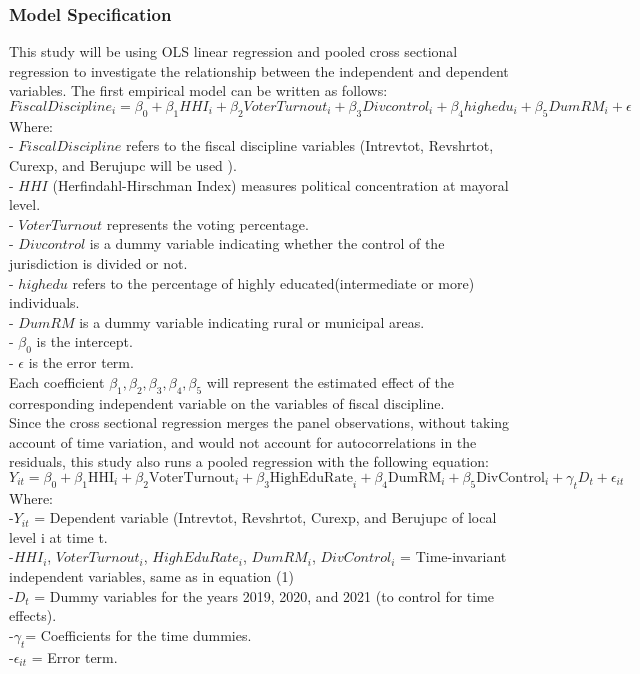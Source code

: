 \subsubsection{Model Specification}
This study will be using OLS linear regression and pooled cross sectional regression to investigate the relationship between the independent and dependent variables. The first empirical model can be written as follows:
\begin{equation}
FiscalDiscipline_i = \beta_0 + \beta_1 HHI_i + \beta_2 VoterTurnout_i + \beta_3 Divcontrol_i+  \beta_4 highedu _i+ \beta_5 DumRM_i + \epsilon
\end{equation}
Where:\\
- \(FiscalDiscipline\) refers to the fiscal discipline variables (Intrevtot, Revshrtot, Curexp, and Berujupc will be used ).\\
- \(HHI\) (Herfindahl-Hirschman Index) measures political concentration at mayoral level.\\
- \(VoterTurnout\) represents the voting percentage.\\
- \(Divcontrol\) is a dummy variable indicating whether the control of the jurisdiction is divided or not.\\
- \(highedu\) refers to the percentage of highly educated(intermediate or more) individuals.\\
- \(DumRM\) is a dummy variable indicating rural or municipal areas.\\
- \(\beta_0\) is the intercept.\\
- \(\epsilon\) is the error term.\\
Each coefficient \(\beta_1, \beta_2, \beta_3, \beta_4, \beta_5\) will represent the estimated effect of the corresponding independent variable on the variables of fiscal discipline.\\
Since the cross sectional regression merges the panel observations, without taking account of time variation, and would not account for autocorrelations in the residuals, this study also runs a pooled regression with the following equation:
\begin{equation}
Y_{it} = \beta_0 + \beta_1 \text{HHI}_i + \beta_2 \text{VoterTurnout}_i + \beta_3 \text{HighEduRate}_i + \beta_4 \text{DumRM}_i + \beta_5 \text{DivControl}_i + \gamma_t D_t + \epsilon_{it}
\end{equation}
Where:\\
-\(Y_{it}\) = Dependent variable (Intrevtot, Revshrtot, Curexp, and Berujupc of local level  i at time  t.\\
-\(HHI_{i}\), \(VoterTurnout_{i}\), \(HighEduRate_{i}\), \(DumRM_{i}\), \(DivControl_{i}\) = Time-invariant independent variables, same as in equation (1)\\
-\(D_t\) = Dummy variables for the years 2019, 2020, and 2021 (to control for time effects).\\
-\(\gamma_t \)= Coefficients for the time dummies.\\
-\(\epsilon_{it}\) = Error term.

